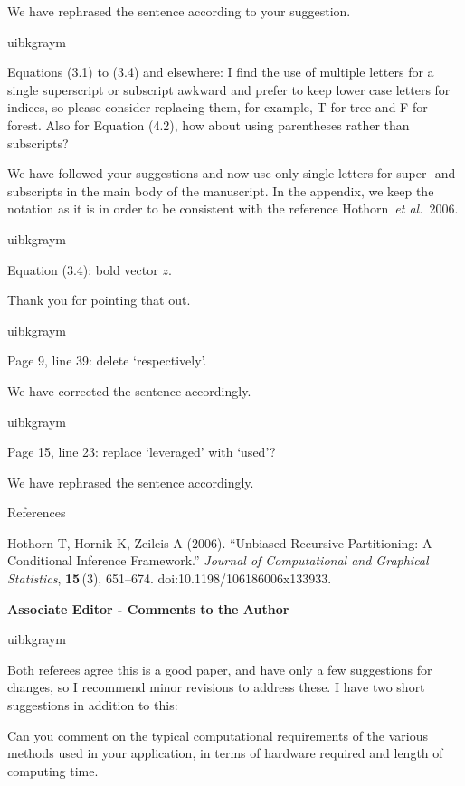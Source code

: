 \documentclass[english, noconfig]{uibklttr}
\newcommand{\section}[1]{{\Large{\textbf{#1}}}}
\newenvironment{re}{
    \begin{color}{uibkgraym}
        \itshape
}{
    \end{color}
}
\begin{document}
We have rephrased the sentence according to your suggestion.

\vspace{0.5em}
\begin{re}
Equations (3.1) to (3.4) and elsewhere: I find the use of multiple letters for a single superscript or subscript awkward and prefer to keep lower case letters for indices, so please consider replacing them, for example, T for tree and F for forest. Also for Equation (4.2), how about using parentheses rather than subscripts?
\end{re}

We have followed your suggestions and now use only single letters for super-
and subscripts in the main body of the manuscript. In the appendix, we keep the
notation as it is in order to be consistent with the reference Hothorn~\emph{et al.}~2006.

\vspace{0.5em}
\begin{re}
Equation (3.4): bold vector $z$.
\end{re}

Thank you for pointing that out.

\vspace{0.5em}
\begin{re}
Page 9, line 39: delete `respectively'.
\end{re}

We have corrected the sentence accordingly.

\vspace{0.5em}
\begin{re}
Page 15, line 23: replace `leveraged' with `used'?
\end{re}

We have rephrased the sentence accordingly.

\vspace{0.5cm}
References

Hothorn T, Hornik K, Zeileis A (2006). ``Unbiased Recursive Partitioning: A Conditional
Inference Framework.'' \emph{Journal of Computational and Graphical Statistics}, \textbf{15}\,(3), 651--674.
doi:10.1198/106186006x133933.

\newpage

\section{Associate Editor - Comments to the Author}

\begin{re}
Both referees agree this is a good paper, and have only a few suggestions for
changes, so I recommend minor revisions to address these. I have two short suggestions in addition to this:

Can you comment on the typical computational requirements of the various
methods used in your application, in terms of hardware required and length of
computing time.
\end{re}
\end{document}
